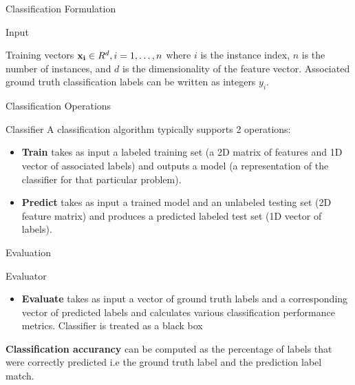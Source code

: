 \documentclass[12pt]{beamer}
\begin{document}
\begin{frame}{Classification Formulation} 

\begin{block}{Input}

Training vectors ${\bf x_i} \in R^{d}, i=1,\dots,n$ where $i$ is the
instance index, $n$ is the number of instances, and $d$ is the
dimensionality of the feature vector. Associated ground truth classification labels can be written as integers $y_i$.  
\end{block} 

\end{frame}



\begin{frame}{Classification Operations} 

\begin{block}{Classifier}
A classification algorithm typically supports 2 operations:  
\begin{itemize} 
\item{\bf Train} takes as input a labeled training set (a 2D matrix
  of features and 1D vector of associated labels) and outputs a model
  (a representation of the classifier for that particular problem). 
\pause
\item{\bf Predict} takes as input a trained model and an unlabeled
   testing set (2D feature matrix) and produces a predicted labeled
   test set (1D vector of labels).
\end{itemize} 
\end{block}
\end{frame}

\begin{frame}{Evaluation} 
\begin{block}{Evaluator} 
\begin{itemize}
\item{\bf Evaluate} takes as input a vector of ground truth labels 
and a corresponding vector of predicted labels and calculates various 
classification performance metrics. Classifier is treated as a black box 
\end{itemize}
\end{block} 
\pause 
\begin{example}
{\bf Classification accurancy} can be computed as the percentage of labels that were correctly predicted i.e the ground truth label and the prediction label match. 
\end{example}
\end{frame}
\end{document}

